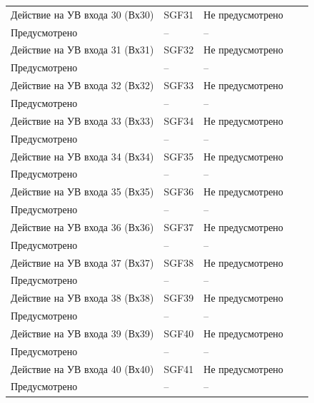 \begin{longtable}{|>{\centering\arraybackslash}m{5.3cm}|>{\centering\arraybackslash}m{3.3cm}|>{\centering\arraybackslash}m{4.2cm}|>{\centering\arraybackslash}m{1.8cm}|>{\centering\arraybackslash}m{1cm}|}
\hline
\centering Действие на УВ входа 30 (Вх30)  & \centering SGF31 & \centering Не предусмотрено \\ Предусмотрено & \centering -- & \centering \arraybackslash -- \\
\hline
\centering Действие на УВ входа 31 (Вх31)  & \centering SGF32 & \centering Не предусмотрено \\ Предусмотрено & \centering -- & \centering \arraybackslash -- \\
\hline
\centering Действие на УВ входа 32 (Вх32)  & \centering SGF33 & \centering Не предусмотрено \\ Предусмотрено & \centering -- & \centering \arraybackslash -- \\
\hline
\centering Действие на УВ входа 33 (Вх33)  & \centering SGF34 & \centering Не предусмотрено \\ Предусмотрено & \centering -- & \centering \arraybackslash -- \\
\hline
\centering Действие на УВ входа 34 (Вх34)  & \centering SGF35 & \centering Не предусмотрено \\ Предусмотрено & \centering -- & \centering \arraybackslash -- \\
\hline
\centering Действие на УВ входа 35 (Вх35)  & \centering SGF36 & \centering Не предусмотрено \\ Предусмотрено & \centering -- & \centering \arraybackslash -- \\
\hline
\centering Действие на УВ входа 36 (Вх36)  & \centering SGF37 & \centering Не предусмотрено \\ Предусмотрено & \centering -- & \centering \arraybackslash -- \\
\hline
\centering Действие на УВ входа 37 (Вх37)  & \centering SGF38 & \centering Не предусмотрено \\ Предусмотрено & \centering -- & \centering \arraybackslash -- \\
\hline
\centering Действие на УВ входа 38 (Вх38)  & \centering SGF39 & \centering Не предусмотрено \\ Предусмотрено & \centering -- & \centering \arraybackslash -- \\
\hline
\centering Действие на УВ входа 39 (Вх39)  & \centering SGF40 & \centering Не предусмотрено \\ Предусмотрено & \centering -- & \centering \arraybackslash -- \\
\hline
\centering Действие на УВ входа 40 (Вх40)  & \centering SGF41 & \centering Не предусмотрено \\ Предусмотрено & \centering -- & \centering \arraybackslash -- \\

\end{longtable}
